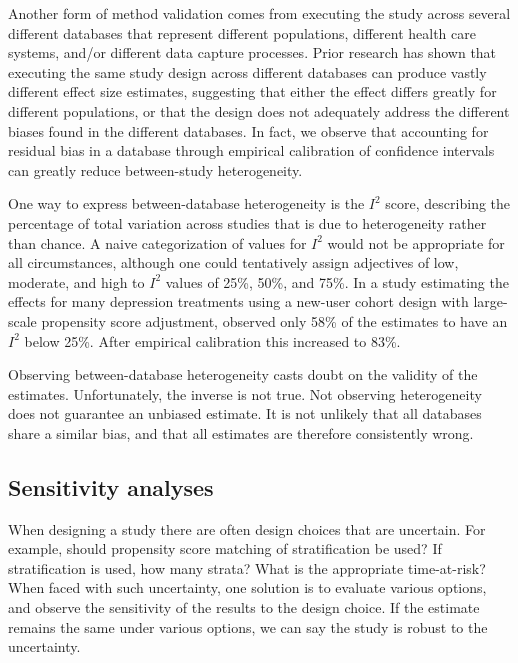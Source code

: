 \documentclass[11pt]{book}
\theoremstyle{definition}
\theoremstyle{definition}
\theoremstyle{definition}
\theoremstyle{remark}
\let\BeginKnitrBlock\begin \let\EndKnitrBlock\end
\begin{document}
Another form of method validation comes from executing the study across several different databases that represent different populations, different health care systems, and/or different data capture processes. Prior research has shown that executing the same study design across different databases can produce vastly different effect size estimates, \citep{madigan_2013} suggesting that either the effect differs greatly for different populations, or that the design does not adequately address the different biases found in the different databases. In fact, we observe that accounting for residual bias in a database through empirical calibration of confidence intervals can greatly reduce between-study heterogeneity. \citep{schuemie_2018}

One way to express between-database heterogeneity is the \(I^2\) score, describing the percentage of total variation across studies that is due to heterogeneity rather than chance. \citep{higgins_2003} A naive categorization of values for \(I^2\) would not be appropriate for all circumstances, although one could tentatively assign adjectives of low, moderate, and high to \(I^2\) values of 25\%, 50\%, and 75\%. In a study estimating the effects for many depression treatments using a new-user cohort design with large-scale propensity score adjustment, \citet{schuemie_2018b} observed only 58\% of the estimates to have an \(I^2\) below 25\%. After empirical calibration this increased to 83\%.

\BeginKnitrBlock{rmdimportant}
Observing between-database heterogeneity casts doubt on the validity of the estimates. Unfortunately, the inverse is not true. Not observing heterogeneity does not guarantee an unbiased estimate. It is not unlikely that all databases share a similar bias, and that all estimates are therefore consistently wrong.
\EndKnitrBlock{rmdimportant}

\hypertarget{sensitivity-analyses}{%
\subsection{Sensitivity analyses}\label{sensitivity-analyses}}

When designing a study there are often design choices that are uncertain. For example, should propensity score matching of stratification be used? If stratification is used, how many strata? What is the appropriate time-at-risk? When faced with such uncertainty, one solution is to evaluate various options, and observe the sensitivity of the results to the design choice. If the estimate remains the same under various options, we can say the study is robust to the uncertainty.
\end{document}
